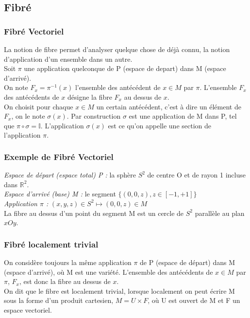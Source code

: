 \documentclass[a4paper,11pt]{article} %
\numberwithin{equation}{section} %
\numberwithin{figure}{section} %
\theoremstyle{plain} %
\theoremstyle{definition} %
\theoremstyle{remark} %
\begin{document}
\subsection{Fibr\'e}

\subsubsection{Fibr\'e Vectoriel}

\noindent
La notion de fibre permet d'analyser quelque chose de d\'ej\`a connu, la notion d'application d'un ensemble dans un autre.\\

\noindent
Soit $\pi$ une application quelconque de P (espace de depart) dans M (espace d'arriv\'e).\\
On note $F_{x} = \pi^{-1} (x)$ l'ensemble des ant\'ec\'edent de $x \in M$ par $\pi$. L'ensemble $F_{x}$ des ant\'ec\'edents de $x$ d\'esigne la fibre $F_{x}$ au dessus de $x$.\\

\noindent
On choisit pour chaque $x \in M$ un certain ant\'ec\'edent, c'est \`a dire un \'el\'ement de  $F_{x}$, on le note $\sigma(x)$. Par construction $\sigma$ est une application de M dans P, tel que $\pi  \circ \sigma = \mathbb{I}$. L'application $\sigma(x)$ est ce qu'on appelle une section de l'application $\pi$.

\subsubsection{Exemple de Fibr\'e Vectoriel}

\noindent
\textit{Espace de d\'epart (espace total) P :} la sph\`ere $S^2$ de centre O et de rayon 1 incluse dans  $ \mathbb{R}^{2}$.\\
\textit{Espace d'arriv\'e  (base) M :} le segment $\{(0,0,z) , z \in [-1,+1] \}$\\
\textit{Application $\pi$ :} $(x,y,z) \in  S^2 \mapsto (0,0,z) \in M $\\
La fibre au dessus d'un point du segment M est un cercle de $S^2$ parall\`ele au plan $xOy$.

\subsubsection{Fibr\'e localement trivial}

\noindent
On consid\`ere toujours la m\^eme application $\pi$ de P (espace de d\'epart) dans M (espace d'arriv\'e), o\`u M est une vari\'et\'e. L'ensemble des ant\'ec\'edents de $x \in M$ par $\pi$, $F_{x}$, est donc la fibre au dessus de $x$.\\
On dit que le fibre est localement trivial, lorsque localement on peut \'ecrire M sous la forme d'un produit cartesien, $M = U \times F$, o\`u U est ouvert de M et F un espace vectoriel.\\
\end{document}
